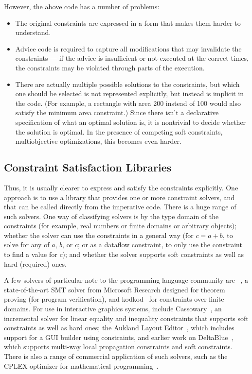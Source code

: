 However, the above code has a number of problems:
\begin{itemize}
\item The original constraints are expressed in a form that makes them
  harder to understand.
\item Advice code is required to capture all modifications that may
  invalidate the constraints --- if the advice is insufficient or not
  executed at the correct times, the constraints may be violated
  through parts of the execution.
\item There are actually multiple possible solutions to the
  constraints, but which one should be selected is not represented
  explicitly, but instead is implicit in the code.  (For example, a
  rectangle with area 200 instead of 100 would also satisfy the
  minimum area constraint.)  Since there isn't a declarative
  specification of what an optimal solution is, it is nontrivial to
  decide whether the solution is optimal. In the presence of competing
  soft constraints, \ie multiobjective optimizations, this becomes
  even harder.
\end{itemize}

\subsection{Constraint Satisfaction Libraries}

Thus, it is usually clearer to express and satisfy the constraints
explicitly.  One approach is to use a library that provides one or
more constraint solvers, and that can be called directly from the
imperative code.  There is a huge range of such solvers.  One way of
classifying solvers is by the type domain of the constraints (for
example, real numbers or finite domains or arbitrary objects); whether
the solver can use the constraints in a general way (\eg for $c=a+b$,
to solve for any of $a$, $b$, or $c$; or as a dataflow constraint, \ie
to only use the constraint to find a value for $c$); and whether the
solver supports soft constraints as well as hard (required) ones.

A few solvers of particular note to the programming language community
are \zthree~\cite{de2008z3}, a state-of-the-art SMT solver from
Microsoft Research designed for theorem proving (\eg for program
verification), and kodkod~\cite{torlak2007kodkod} for constraints over
finite domains.  For use in interactive graphics systems, include
Cassowary~\cite{badros-tochi-2001}, an incremental solver for linear
equality and inequality constraints that supports soft constraints as
well as hard ones; the Aukland Layout Editor~\cite{lutteroth2008end},
which includes support for a GUI builder using constraints, and
earlier work on DeltaBlue~\cite{freeman-benson-phoenix-1989}, which
supports multi-way local propagation constraints and soft constraints.
There is also a range of commercial application of such solvers, such
as the CPLEX optimizer for mathematical
programming~\cite{optimization1993using}.

